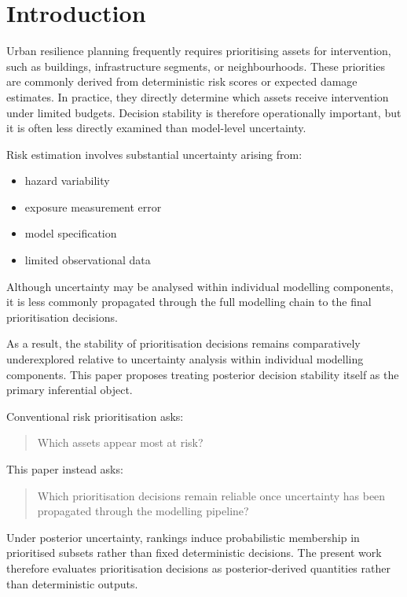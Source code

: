 \documentclass[
]{article}
\providecommand{\tightlist}{%
  \setlength{\itemsep}{0pt}\setlength{\parskip}{0pt}}
\begin{document}
\section{Introduction}\label{introduction}

Urban resilience planning frequently requires prioritising assets for
intervention, such as buildings, infrastructure segments, or
neighbourhoods. These priorities are commonly derived from deterministic
risk scores or expected damage estimates. In practice, they directly
determine which assets receive intervention under limited budgets.
Decision stability is therefore operationally important, but it is often
less directly examined than model-level uncertainty.

Risk estimation involves substantial uncertainty arising from:

\begin{itemize}
\tightlist
\item
  hazard variability
\item
  exposure measurement error
\item
  model specification
\item
  limited observational data
\end{itemize}

Although uncertainty may be analysed within individual modelling
components, it is less commonly propagated through the full modelling
chain to the final prioritisation decisions.

As a result, the stability of prioritisation decisions remains
comparatively underexplored relative to uncertainty analysis within
individual modelling components. This paper proposes treating posterior
decision stability itself as the primary inferential object.

Conventional risk prioritisation asks:

\begin{quote}
Which assets appear most at risk?
\end{quote}

This paper instead asks:

\begin{quote}
Which prioritisation decisions remain reliable once uncertainty has been
propagated through the modelling pipeline?
\end{quote}

Under posterior uncertainty, rankings induce probabilistic membership in
prioritised subsets rather than fixed deterministic decisions. The
present work therefore evaluates prioritisation decisions as
posterior-derived quantities rather than deterministic outputs.
\end{document}
